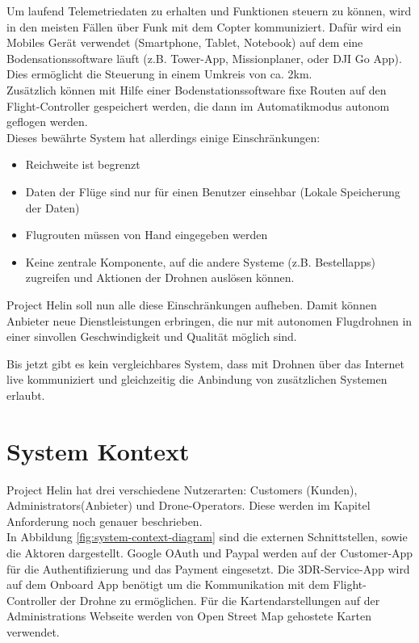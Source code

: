 Um laufend Telemetriedaten zu erhalten und Funktionen steuern zu können, wird in den meisten Fällen über Funk mit dem Copter kommuniziert. Dafür wird ein Mobiles Gerät verwendet (Smartphone, Tablet, Notebook) auf dem eine Bodensationssoftware läuft (z.B. Tower-App, Missionplaner, oder DJI Go App). Dies ermöglicht die Steuerung in einem Umkreis von ca. 2km.  \\

Zusätzlich können mit Hilfe einer Bodenstationssoftware fixe Routen auf den Flight-Controller gespeichert werden, die dann im Automatikmodus autonom geflogen werden.\\

Dieses bewährte System hat allerdings einige Einschränkungen: 

\begin{itemize}
	\item{Reichweite ist begrenzt}
	\item{Daten der Flüge sind nur für einen Benutzer einsehbar (Lokale Speicherung der Daten)}
	\item{Flugrouten müssen von Hand eingegeben werden}
	\item{Keine zentrale Komponente, auf die andere Systeme (z.B. Bestellapps) zugreifen und Aktionen der Drohnen auslösen können.}
\end{itemize}

Project Helin soll nun alle diese Einschränkungen aufheben. Damit können Anbieter neue Dienstleistungen erbringen, die nur mit autonomen Flugdrohnen in einer sinvollen Geschwindigkeit und Qualität möglich sind.

Bis jetzt gibt es kein vergleichbares System, dass mit Drohnen über das Internet live kommuniziert und gleichzeitig die Anbindung von zusätzlichen Systemen erlaubt.

\section{System Kontext}

Project Helin hat drei verschiedene Nutzerarten: Customers (Kunden), Administrators(Anbieter) und Drone-Operators. Diese werden im Kapitel Anforderung noch genauer beschrieben.\\

In Abbildung \ref{fig:system-context-diagram} sind die externen Schnittstellen, sowie die Aktoren dargestellt. Google OAuth und Paypal werden auf der Customer-App für die Authentifizierung und das Payment eingesetzt. Die 3DR-Service-App wird auf dem Onboard App benötigt um die Kommunikation mit dem Flight-Controller der Drohne zu ermöglichen. Für die Kartendarstellungen auf der Administrations Webseite werden von Open Street Map gehostete Karten verwendet.


